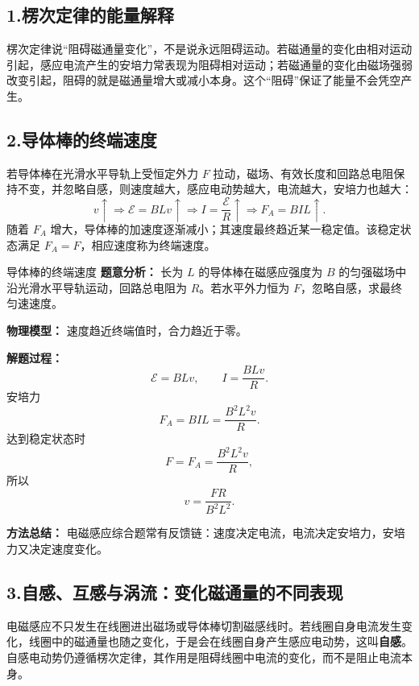 \subsection*{1.\quad 楞次定律的能量解释}

楞次定律说“阻碍磁通量变化”，不是说永远阻碍运动。若磁通量的变化由相对运动引起，感应电流产生的安培力常表现为阻碍相对运动；若磁通量的变化由磁场强弱改变引起，阻碍的就是磁通量增大或减小本身。这个“阻碍”保证了能量不会凭空产生。

\subsection*{2.\quad 导体棒的终端速度}

若导体棒在光滑水平导轨上受恒定外力 $F$ 拉动，磁场、有效长度和回路总电阻保持不变，并忽略自感，则速度越大，感应电动势越大，电流越大，安培力也越大：
\[
v\uparrow \Rightarrow \mathcal E=BLv\uparrow \Rightarrow I=\frac{\mathcal E}{R}\uparrow
\Rightarrow F_A=BIL\uparrow.
\]
随着 $F_A$ 增大，导体棒的加速度逐渐减小；其速度最终趋近某一稳定值。该稳定状态满足 $F_A=F$，相应速度称为终端速度。

\begin{center}


\label{fig:motional-terminal-speed}
\end{center}

\begin{examplebox}{导体棒的终端速度}
\textbf{题意分析：} 长为 $L$ 的导体棒在磁感应强度为 $B$ 的匀强磁场中沿光滑水平导轨运动，回路总电阻为 $R$。若水平外力恒为 $F$，忽略自感，求最终匀速速度。

\textbf{物理模型：} 速度趋近终端值时，合力趋近于零。

\textbf{解题过程：}
\[
\mathcal E=BLv,\qquad I=\frac{BLv}{R}.
\]
安培力
\[
F_A=BIL=\frac{B^2L^2v}{R}.
\]
达到稳定状态时
\[
F=F_A=\frac{B^2L^2v}{R},
\]
所以
\[
v=\frac{FR}{B^2L^2}.
\]

\textbf{方法总结：} 电磁感应综合题常有反馈链：速度决定电流，电流决定安培力，安培力又决定速度变化。
\end{examplebox}

\subsection*{3.\quad 自感、互感与涡流：变化磁通量的不同表现}

电磁感应不只发生在线圈进出磁场或导体棒切割磁感线时。若线圈自身电流发生变化，线圈中的磁通量也随之变化，于是会在线圈自身产生感应电动势，这叫\textbf{自感}。自感电动势仍遵循楞次定律，其作用是阻碍线圈中电流的变化，而不是阻止电流本身。

